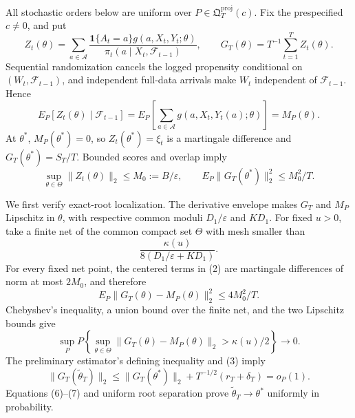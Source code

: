 All stochastic orders below are uniform over
\(P\in\mathfrak Q_T^{\mathrm{proj}}(c)\).  Fix the prespecified
\(c\ne0\), and put
\[
 Z_t(\theta)=\sum_{a\in\mathcal A}
 \frac{\mathbf1\{A_t=a\}g(a,X_t,Y_t;\theta)}
 {\pi_t(a\mid X_t,\mathcal F_{t-1})},
 \qquad G_T(\theta)=T^{-1}\sum_{t=1}^TZ_t(\theta).
\tag{1}
\]
Sequential randomization cancels the logged propensity conditional on
\((W_t,\mathcal F_{t-1})\), and independent full-data arrivals make \(W_t\)
independent of \(\mathcal F_{t-1}\).  Hence
\[
 E_P[Z_t(\theta)\mid\mathcal F_{t-1}]
 =E_P\!\left[\sum_{a\in\mathcal A}g(a,X_t,Y_t(a);\theta)\right]
 =M_P(\theta).
\tag{2}
\]
At \(\theta^*\), \(M_P(\theta^*)=0\), so
\(Z_t(\theta^*)=\xi_t\) is a martingale difference and
\(G_T(\theta^*)=S_T/T\).  Bounded scores and overlap imply
\[
 \sup_{\theta\in\Theta}\|Z_t(\theta)\|_2\le M_0:=B/\varepsilon,
 \qquad
 E_P\|G_T(\theta^*)\|_2^2\le M_0^2/T.
\tag{3}
\]

We first verify exact-root localization.  The derivative envelope makes
\(G_T\) and \(M_P\) Lipschitz in \(\theta\), with respective common moduli
\(D_1/\varepsilon\) and \(KD_1\).  For fixed \(u>0\), take a finite net of
the common compact set \(\Theta\) with mesh smaller than
\[
 \frac{\kappa(u)}{8(D_1/\varepsilon+KD_1)}.
\tag{4}
\]
For every fixed net point, the centered terms in (2) are martingale
differences of norm at most \(2M_0\), and therefore
\[
 E_P\|G_T(\theta)-M_P(\theta)\|_2^2\le4M_0^2/T.
\tag{5}
\]
Chebyshev's inequality, a union bound over the finite net, and the two
Lipschitz bounds give
\[
 \sup_P P\!\left\{\sup_{\theta\in\Theta}
 \|G_T(\theta)-M_P(\theta)\|_2>\kappa(u)/2\right\}\longrightarrow0.
\tag{6}
\]
The preliminary estimator's defining inequality and (3) imply
\[
 \|G_T(\widetilde\theta_T)\|_2
 \le\|G_T(\theta^*)\|_2+T^{-1/2}(r_T+\delta_T)=o_P(1).
\tag{7}
\]
Equations (6)--(7) and uniform root separation prove
\(\widetilde\theta_T\to\theta^*\) uniformly in probability.

